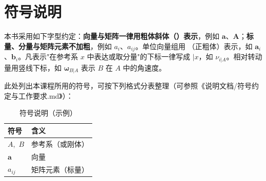 \section{符号说明}
\label{sec:符号说明}

本书采用如下字型约定：\textbf{向量与矩阵一律用粗体斜体（$\boldsymbol{}$）表示}，例如 $\boldsymbol{a}$、$\boldsymbol{A}$；\textbf{标量、分量与矩阵元素不加粗}，例如 $a_i$、$a_{ij}$。单位向量组用 $\mathbf{}$（正粗体）表示，如 $\mathbf{a}_i$、$\mathbf{b}_i$。凡表示"在参考系 $x$ 中表达或取分量"的下标一律写成 $|x$，如 $\nu_{i|A}$。相对转动量用竖线下标，如 $\boldsymbol{\omega}_{B|A}$ 表示 $B$ 在 $A$ 中的角速度。

此处列出本课程所用的符号，可按下列格式分表整理（可参照《说明文档/符号约定与工作要求.md》）：

\begin{table}[H]
\centering
\caption{符号说明（示例）}
\label{tab:符号说明}
\begin{tabular}{ll}
\toprule
符号 & 含义 \\
\midrule
$A$,\, $B$ & 参考系（或刚体） \\
$\boldsymbol{a}$ & 向量 \\
$a_{ij}$ & 矩阵元素（标量） \\
\bottomrule
\end{tabular}
\end{table}
